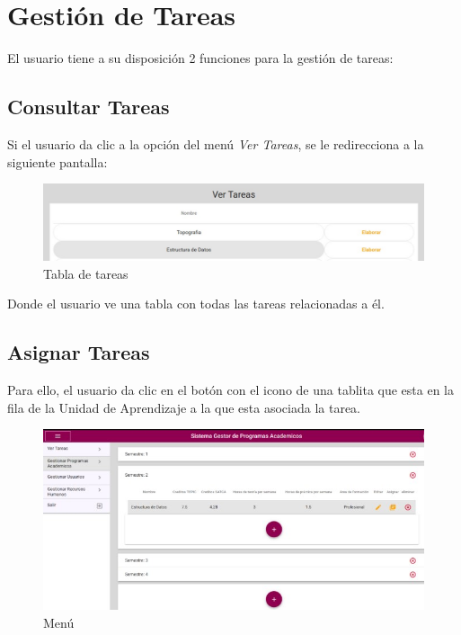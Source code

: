 \section{Gestión de Tareas}
        El usuario tiene a su disposición 2 funciones para la gestión de tareas:
        \subsection{Consultar Tareas}

            Si el usuario da clic a la opción del menú \textit{Ver Tareas}, se le redirecciona a la siguiente pantalla:
            \begin{figure}[H]
                \centering
                \hypertarget{asignart}{\includegraphics[width=0.7\linewidth]{images/Tareas/Vertareas}}
                \caption{Tabla de tareas}
                \label{asignart}
            \end{figure}
            Donde el usuario ve una tabla con todas las tareas relacionadas a él.

        \subsection{Asignar Tareas}

            Para ello, el usuario da clic en el botón con el icono de una tablita que esta en la fila de la Unidad de Aprendizaje a la que esta asociada la tarea.


            \begin{figure}[H]
                \centering
                \hypertarget{menu}{\includegraphics[width=0.7\linewidth]{images/Tareas/Menu}}
                \caption{Menú}
                \label{menu}
            \end{figure}


